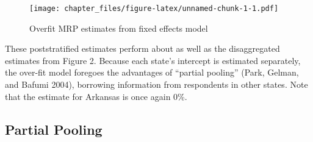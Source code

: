 \documentclass[
]{article}
\newenvironment{Shaded}{\begin{snugshade}}{\end{snugshade}}
\newcommand{\AttributeTok}[1]{\textcolor[rgb]{0.77,0.63,0.00}{#1}}
\newcommand{\CommentTok}[1]{\textcolor[rgb]{0.56,0.35,0.01}{\textit{#1}}}
\newcommand{\FunctionTok}[1]{\textcolor[rgb]{0.00,0.00,0.00}{#1}}
\newcommand{\NormalTok}[1]{#1}
\newcommand{\OtherTok}[1]{\textcolor[rgb]{0.56,0.35,0.01}{#1}}
\newcommand{\SpecialCharTok}[1]{\textcolor[rgb]{0.00,0.00,0.00}{#1}}
\newcommand{\StringTok}[1]{\textcolor[rgb]{0.31,0.60,0.02}{#1}}
\begin{document}
\begin{Shaded}
\end{Shaded}

\begin{figure}
\centering
\texttt{[image: chapter\_files/figure-latex/unnamed-chunk-1-1.pdf]}
\caption{Overfit MRP estimates from fixed effects model}
\end{figure}

These poststratified estimates perform about as well as the
disaggregated estimates from Figure 2. Because each state's intercept is
estimated separately, the over-fit model foregoes the advantages of
``partial pooling'' (Park, Gelman, and Bafumi 2004), borrowing
information from respondents in other states. Note that the estimate for
Arkansas is once again 0\%.

\hypertarget{partial-pooling}{%
\subsection{Partial Pooling}\label{partial-pooling}}
\end{document}
